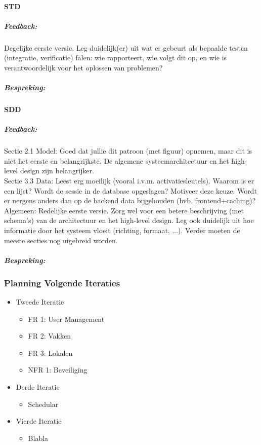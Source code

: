 \paragraph{STD}
\subparagraph{Feedback:}
Degelijke eerste versie.
Leg duidelijk(er) uit wat er gebeurt als bepaalde testen (integratie, verificatie) falen: wie rapporteert, wie volgt dit op, en wie is verantwoordelijk voor het oplossen van problemen?

\subparagraph{Bespreking:}

\paragraph{SDD}
\subparagraph{Feedback:}
Sectie 2.1 Model: Goed dat jullie dit patroon (met figuur) opnemen, maar dit is niet het eerste en belangrijkste.
De algemene systeemarchitectuur en het high-level design zijn belangrijker.
\\
Sectie 3.3 Data: Leest erg moeilijk (vooral i.v.m. activatiesleutels). Waarom is er een lijst?
Wordt de sessie in de database opgeslagen? Motiveer deze keuze.
Wordt er nergens anders dan op de backend data bijgehouden (bvb. frontend+caching)?
\\
Algemeen: Redelijke eerste versie. Zorg wel voor een betere beschrijving (met schema's) van de architectuur en het high-level design.
Leg ook duidelijk uit hoe informatie door het systeem vloeit (richting, formaat, ...).
Verder moeten de meeste secties nog uigebreid worden.
\subparagraph{Bespreking:}

\subsubsection{Planning Volgende Iteraties}
\begin{itemize}
	\item
	{
		Tweede Iteratie
		\begin{itemize}
			\item FR 1: User Management
			\item FR 2: Vakken
			\item FR 3: Lokalen
			\item NFR 1: Beveiliging
		\end{itemize}
	}
	\item
	{
		Derde Iteratie
		\begin{itemize}
			\item Schedular
		\end{itemize}
	}
	\item
	{
		Vierde Iteratie
		\begin{itemize}
			\item Blabla
		\end{itemize}
	}
\end{itemize}

